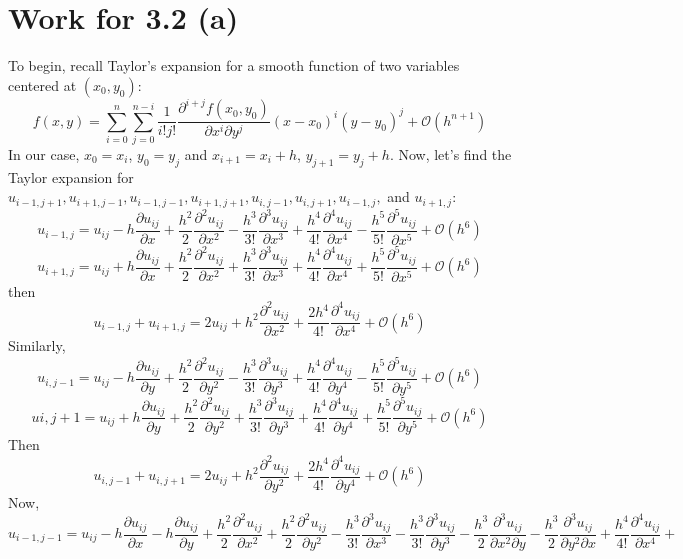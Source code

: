 \documentclass{article}
\begin{document}
\section*{Work for 3.2 (a)}
To begin, recall Taylor's expansion for a smooth function of two variables centered at $(x_0, y_0)$:
\[f(x,y) = \sum_{i=0}^n\sum_{j=0}^{n-i} \frac{1}{i!j!}\frac{\partial^{i + j}f(x_0,y_0)}{\partial x^i \partial y^{j}}(x - x_0)^i(y - y_0)^j + \mathcal{O}(h^{n+1})\]
In our case, $x_0 = x_i$, $y_0 = y_j$ and $x_{i+1} = x_i + h$, $y_{j+1} = y_j + h$.
\newline
Now, let's find the Taylor expansion for $u_{i-1,j+1}, u_{i+1,j-1}, u_{i-1,j-1}, u_{i+1,j+1}, u_{i, j-1}, u_{i,j+1}, u_{i-1,j},$ and $u_{i+1,j}$:
\[u_{i-1,j} = u_{ij} - h\frac{\partial u_{ij}}{\partial x} + \frac{h^2}{2}\frac{\partial^2 u_{ij}}{\partial x^2} - \frac{h^3}{3!}\frac{\partial^3 u_{ij}}{\partial x^3} + \frac{h^4}{4!}\frac{\partial^4 u_{ij}}{\partial x^4} - \frac{h^5}{5!}\frac{\partial^5 u_{ij}}{\partial x^5} + \mathcal{O}(h^6)\]
\[u_{i+1,j} = u_{ij} + h\frac{\partial u_{ij}}{\partial x} + \frac{h^2}{2}\frac{\partial^2 u_{ij}}{\partial x^2} + \frac{h^3}{3!}\frac{\partial^3 u_{ij}}{\partial x^3} + \frac{h^4}{4!}\frac{\partial^4 u_{ij}}{\partial x^4} + \frac{h^5}{5!}\frac{\partial^5 u_{ij}}{\partial x^5} + \mathcal{O}(h^6)\]
then
\begin{equation}
    u_{i-1,j} + u_{i+1,j} = 2u_{ij} + h^2\frac{\partial^2 u_{ij}}{\partial x^2} + \frac{2h^4}{4!}\frac{\partial^4 u_{ij}}{\partial x^4} + \mathcal{O}(h^6)
\end{equation}
Similarly,
\[u_{i,j-1} = u_{ij} - h\frac{\partial u_{ij}}{\partial y} + \frac{h^2}{2}\frac{\partial^2 u_{ij}}{\partial y^2} - \frac{h^3}{3!}\frac{\partial^3 u_{ij}}{\partial y^3} + \frac{h^4}{4!}\frac{\partial^4 u_{ij}}{\partial y^4} - \frac{h^5}{5!}\frac{\partial^5 u_{ij}}{\partial y^5} + \mathcal{O}(h^6)\]
\[u{i,j+1} = u_{ij} + h\frac{\partial u_{ij}}{\partial y} + \frac{h^2}{2}\frac{\partial^2 u_{ij}}{\partial y^2} + \frac{h^3}{3!}\frac{\partial^3 u_{ij}}{\partial y^3} + \frac{h^4}{4!}\frac{\partial^4 u_{ij}}{\partial y^4} + \frac{h^5}{5!}\frac{\partial^5 u_{ij}}{\partial y^5} + \mathcal{O}(h^6)\]
Then
\begin{equation}
    u_{i, j-1} + u_{i, j+1} = 2u_{ij} + h^2\frac{\partial^2 u_{ij}}{\partial y^2} + \frac{2h^4}{4!}\frac{\partial^4 u_{ij}}{\partial y^4} + \mathcal{O}(h^6)
\end{equation}
Now,
\[u_{i-1,j-1} = u_{ij} - h\frac{\partial u_{ij}}{\partial x} - h\frac{\partial u_{ij}}{\partial y} + \frac{h^2}{2}\frac{\partial^2 u_{ij}}{\partial x^2} + \frac{h^2}{2}\frac{\partial^2 u_{ij}}{\partial y^2} - \frac{h^3}{3!}\frac{\partial^3 u_{ij}}{\partial x^3} - \frac{h^3}{3!}\frac{\partial^3 u_{ij}}{\partial y^3} - \frac{h^3}{2}\frac{\partial^3 u_{ij}}{\partial x^2 \partial y} - \frac{h^3}{2}\frac{\partial^3 u_{ij}}{\partial y^2 \partial x} + \frac{h^4}{4!}\frac{\partial^4 u_{ij}}{\partial x^4} + \]
\end{document}
